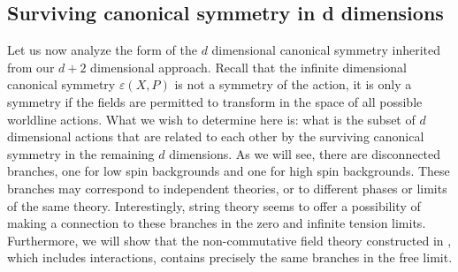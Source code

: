 \documentclass[a4paper,12pt]{article}
\begin{document}
\subsection{Surviving canonical symmetry in d dimensions}

Let us now analyze the form of the $d$ dimensional canonical symmetry
inherited from our $d+2$ dimensional approach. Recall that the infinite
dimensional canonical symmetry $\varepsilon \left( X,P\right) $ is not a
symmetry of the action, it is only a symmetry if the fields are permitted to
transform in the space of all possible worldline actions. What we wish to
determine here is: what is the subset of $d$ dimensional actions that are
related to each other by the surviving canonical symmetry in the remaining $%
d $ dimensions. As we will see, there are disconnected branches, one for low
spin backgrounds and one for high spin backgrounds. These branches may
correspond to independent theories, or to different phases or limits of the
same theory. Interestingly, string theory seems to offer a possibility of
making a connection to these branches in the zero and infinite tension
limits. Furthermore, we will show that the non-commutative field theory
constructed in \cite{ncsp}, which includes interactions, contains precisely
the same branches in the free limit.
\end{document}
